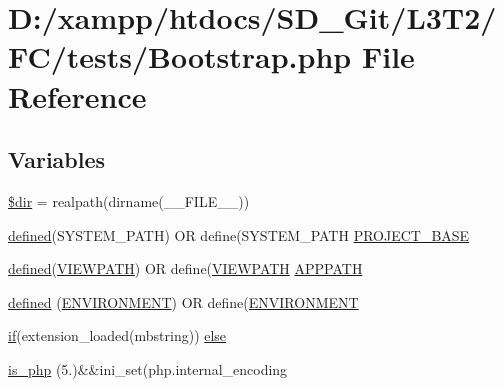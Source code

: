 \hypertarget{tests_2_bootstrap_8php}{}\section{D\+:/xampp/htdocs/\+S\+D\+\_\+\+Git/\+L3\+T2/\+F\+C/tests/\+Bootstrap.php File Reference}
\label{tests_2_bootstrap_8php}
\subsection*{Variables}
\begin{DoxyCompactItemize}
\item 
\hyperlink{tests_2_bootstrap_8php_a1659f0a629d408e0f849dbe4ee061e62}{\$dir} = realpath(dirname(\+\_\+\+\_\+\+F\+I\+L\+E\+\_\+\+\_\+))
\item 
\hyperlink{_admin_2tests_2_bootstrap_8php_a46458e8654a714e0565e20f63021add9}{defined}(\textquotesingle{}S\+Y\+S\+T\+E\+M\+\_\+\+P\+A\+T\+H\textquotesingle{}) O\+R define(\textquotesingle{}S\+Y\+S\+T\+E\+M\+\_\+\+P\+A\+T\+H\textquotesingle{} \hyperlink{tests_2_bootstrap_8php_a8731a5d504a6592ae43e07a048933c32}{P\+R\+O\+J\+E\+C\+T\+\_\+\+B\+A\+S\+E}
\item 
\hyperlink{_admin_2tests_2_bootstrap_8php_a46458e8654a714e0565e20f63021add9}{defined}(\textquotesingle{}\hyperlink{_admin_2index_8php_ade8921d52af58583e5727833459224c3}{V\+I\+E\+W\+P\+A\+T\+H}\textquotesingle{}) O\+R define(\textquotesingle{}\hyperlink{_admin_2index_8php_ade8921d52af58583e5727833459224c3}{V\+I\+E\+W\+P\+A\+T\+H}\textquotesingle{} \hyperlink{tests_2_bootstrap_8php_a45cc636071e9edf22e5709d3c18bc84f}{A\+P\+P\+P\+A\+T\+H}
\item 
\hyperlink{tests_2_bootstrap_8php_a46458e8654a714e0565e20f63021add9}{defined} (\textquotesingle{}\hyperlink{_admin_2index_8php_a8757a57d09df5349f8b93b2083e29a1e}{E\+N\+V\+I\+R\+O\+N\+M\+E\+N\+T}\textquotesingle{}) O\+R define(\textquotesingle{}\hyperlink{_admin_2index_8php_a8757a57d09df5349f8b93b2083e29a1e}{E\+N\+V\+I\+R\+O\+N\+M\+E\+N\+T}\textquotesingle{}
\item 
\hyperlink{_admin_2assets_2js_2bootstrap_8min_8js_a87cf461060832b8b68a7b48d9e371e4f}{if}(extension\+\_\+loaded(\textquotesingle{}mbstring\textquotesingle{})) \hyperlink{tests_2_bootstrap_8php_a67773d041d277deb84668d80e4099034}{else}
\item 
\hyperlink{tests_2_bootstrap_8php_acbea7ca989439eea4c6019ad3c5161aa}{is\+\_\+php} (\textquotesingle{}5.\textquotesingle{})\&\&ini\+\_\+set(\textquotesingle{}php.\+internal\+\_\+encoding\textquotesingle{}
\end{DoxyCompactItemize}


